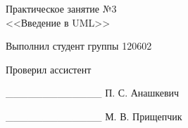 \thispagestyle{empty}
\setlength{\parindent}{0ex} %

\begin{center}
  Практическое занятие №3 \\
  <<Введение в UML>>
\end{center}

\vspace{1\baselineskip}

\begin{minipage}{.5\linewidth}
    Выполнил студент группы 120602 

    \smallskip

    Проверил ассистент
\end{minipage}
\hfill
\begin{minipage}{.45\linewidth}
  \begin{flushright}
    \_\_\_\_\_\_\_\_\_\_\_\_\_ \hspace{0.1mm} П. С. Анашкевич

    \smallskip

    \_\_\_\_\_\_\_\_\_\_\_\_\_ М. В. Прищепчик 
  \end{flushright}
\end{minipage}

\setlength{\parindent}{1.25cm} %